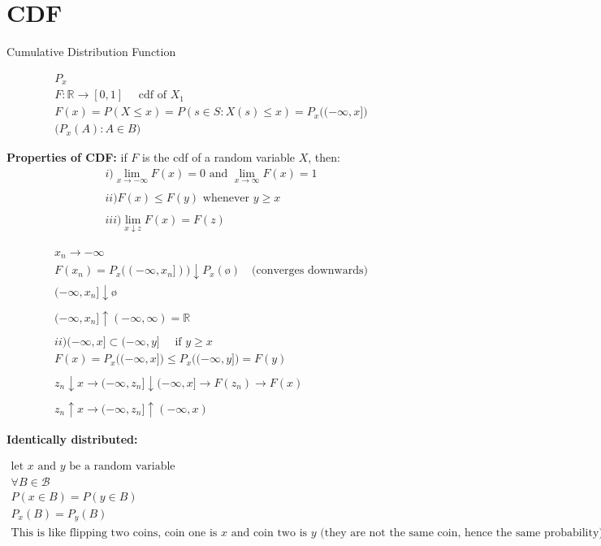 \documentclass[10pt]{article}
\begin{document}
\newpage

\section{CDF}

Cumulative Distribution Function

\begin{align*}
    P_x\\
    F : \mathbb{R} \to [0, 1] \quad\text{ cdf of } X_1\\
    F(x) = P(X \leq x) = P(s \in S : X(s) \leq x) = P_x\big((-\infty, x]\big)\\
    \big(P_x(A) : A \in B\big)
\end{align*}


\textbf{Properties of CDF:}
if $F$ is the cdf of a random variable $X$, then: 
\begin{align*}
    i) \lim_{x \to -\infty} F(x) = 0 \text{ and }\lim_{x \to \infty} F(x) = 1\\
    \\
    ii) F(x) \leq F(y) \text{ whenever } y \geq x\\
    \\
    iii) \lim_{x \downarrow z} F(x) = F(z)
\end{align*}

\begin{align*}
    x_n \to -\infty \\
    F(x_n) = P_x\big((-\infty, x_n])\big) \downarrow P_x(ø) \quad\text{(converges downwards)}\\
    (-\infty, x_n] \downarrow ø\\
    \\
    (-\infty, x_n] \uparrow (-\infty, \infty) = \mathbb{R}\\
    \\
    ii) (-\infty, x] \subset (-\infty, y] \quad\text{ if } y \geq x\\
    F(x) = P_x\big((-\infty, x]\big) \leq P_x\big((-\infty, y]\big) = F(y)\\
    \\
    z_n \downarrow x \to (-\infty, z_n] \downarrow (-\infty, x] \to F(z_n) \to F(x)\\
    \\
    z_n \uparrow x \to (-\infty, z_n] \uparrow (-\infty, x)
\end{align*}

\textbf{Identically distributed:}

\begin{align*}
    \text{let $x$ and $y$ be a random variable}\\
    \forall B \in \mathcal{B}\\
    P(x \in B) = P(y \in B)\\
    P_x(B) = P_y(B)\\
    \text{This is like flipping two coins, coin one is $x$ and coin two is $y$ (they are not the same coin, hence the same probability)}
\end{align*}
\end{document}
